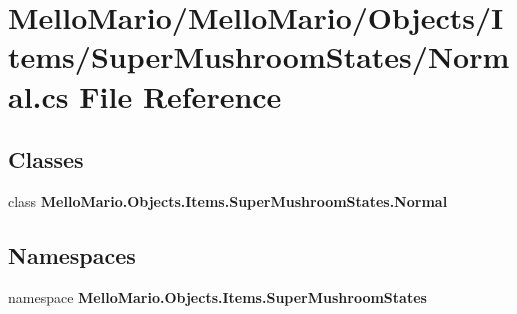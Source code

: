 \section{Mello\+Mario/\+Mello\+Mario/\+Objects/\+Items/\+Super\+Mushroom\+States/\+Normal.cs File Reference}
\label{Items_2SuperMushroomStates_2Normal_8cs}
\subsection*{Classes}
\begin{DoxyCompactItemize}
\item 
class \textbf{ Mello\+Mario.\+Objects.\+Items.\+Super\+Mushroom\+States.\+Normal}
\end{DoxyCompactItemize}
\subsection*{Namespaces}
\begin{DoxyCompactItemize}
\item 
namespace \textbf{ Mello\+Mario.\+Objects.\+Items.\+Super\+Mushroom\+States}
\end{DoxyCompactItemize}
